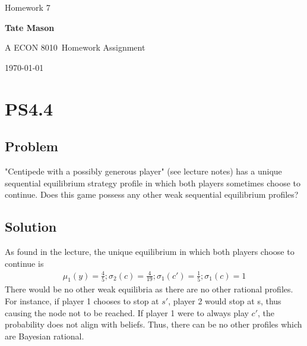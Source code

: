 \documentclass[10pt, a4paper]{article}
\newcommand\course{ECON 8010}                            %
\newcommand\hwnumber{7}                                  %
\newcommand\Information{Tate Mason}                        %
\begin{document}
  \begin{titlepage}
    \begin{center}
      \vspace*{3cm}
            
        \vspace{1cm}
        \huge
        Homework \hwnumber
            
        \vspace{1.5cm}
        \Large
            
        \textbf{\Information}                      %
            
        \vfill
        
        A \course \ Homework Assignment
            
        \vspace{1cm}
        \Large

        
        \today
            
    \end{center}
  \end{titlepage}

  \newpage
  \section*{PS4.4}
    \subsection*{Problem}
      "Centipede with a possibly generous player" (see lecture notes) has a unique sequential equilibrium strategy profile in which both players sometimes choose to continue. Does this game possess any other weak sequential equilibrium profiles?
    \subsection*{Solution}
      As found in the lecture, the unique equilibrium in which both players choose to continue is
      \begin{gather*}
        \mu_1(y)=\frac{4}{5};\sigma_2(c)=\frac{4}{19};\sigma_1(c')=\frac{1}{5};\sigma_1(c)=1
      \end{gather*}
      There would be no other weak equilibria as there are no other rational profiles. For instance, if player 1 chooses to stop at $s'$, player 2 would stop at s, thus causing the node not to be reached. If player 1 were to always play $c'$, the probability does not align with beliefs. Thus, there can be no other profiles which are Bayesian rational.
\end{document}
